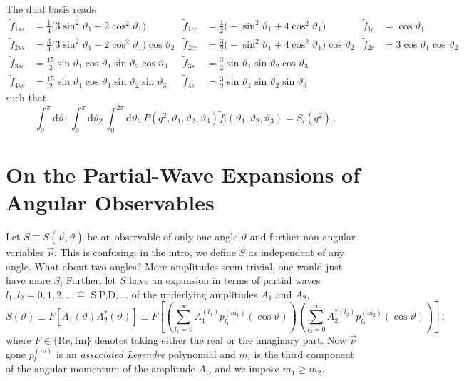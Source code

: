\documentclass[aps,prd,reprint,nofootinbib,preprintnumbers]{revtex4}
\newcommand{\dual}[1]{\tilde{#1}}
\newcommand{\nuvec}{\vec{\nu}}
\newcommand{\rmdx}[1]{\mbox{d} #1 \,} %
\renewcommand{\theta}{\vartheta}
\newcommand{\fred}[1]{{\color{brown!85!black}#1}}
\begin{document}
The dual basis reads
\begin{equation}
    \begin{aligned}
        \dual f_{1ss} & = \frac{1}{4}\big(3 \sin^2\theta_1 - 2 \cos^2\theta_1\big) &
        \dual f_{1cc} & = \frac{1}{2}\big(- \sin^2\theta_1 + 4 \cos^2\theta_1\big) &
        \dual f_{1c}  & = \cos\theta_1\\
        \dual f_{2ss} & = \frac{3}{4}\big(3 \sin^2\theta_1 - 2 \cos^2\theta_1\big) \cos\theta_2 &
        \dual f_{2cc} & = \frac{3}{2}\big(- \sin^2\theta_1 + 4 \cos^2\theta_1\big) \cos\theta_2 &
        \dual f_{2c}  & = 3 \cos\theta_1   \cos\theta_2 \\
        \dual f_{3sc} & = \frac{15}{2}\sin\theta_1 \cos\theta_1 \sin\theta_2 \cos\theta_3 &
        \dual f_{3s}  & = \frac{3}{2} \sin\theta_1              \sin\theta_2 \cos\theta_3 \\
        \dual f_{4sc} & = \frac{15}{2}\sin\theta_1 \cos\theta_1 \sin\theta_2 \sin\theta_3 &
        \dual f_{4s}  & = \frac{3}{2} \sin\theta_1              \sin\theta_2 \sin\theta_3
    \end{aligned}
\end{equation}
such that
\begin{equation}
    \int_0^\pi \rmdx{\theta_1} \int_0^\pi \rmdx{\theta_2} \int_0^{2\pi} \rmdx{\theta_3} P(q^2, \theta_1, \theta_2, \theta_3) \dual{f}_i(\theta_1, \theta_2, \theta_3) = S_i(q^2)\,.
\end{equation}


\section{On the Partial-Wave Expansions of Angular Observables}
\label{app:partial-waves}

Let $S \equiv S(\vec{\nu},\theta)$ be an observable of only one angle $\theta$ and further non-angular variables $\vec{\nu}$. \fred{This is confusing: in the intro, we define $S$ as independent of any angle.} \fred{What about two angles? More amplitudes seem trivial, one would just have more $S_i$} Further, let
$S$ have an expansion in terms of partial waves $l_1, l_2 = 0,1,2,\dots \hat{=}$ S,P,D$,\dots$ of the underlying amplitudes $A_1$ and $A_2$,
\begin{equation}
    \label{eq:def-partial-wave-observable}
    S(\theta) \equiv F\left[A_1(\theta) A_2^*(\theta)\right] \equiv F\left[\left(\sum_{l_1=0}^\infty A_1^{(l_1)} p_{l_1}^{(m_1)}(\cos\theta)\right) \left(\sum_{l_2=0}^\infty A_2^{*(l_2)} p_{l_2}^{(m_2)}(\cos\theta)\right)\right]\,,
\end{equation}
where $F \in \{\text{Re},\text{Im}\}$ denotes taking either the real
or the imaginary part. \fred{Now $\nuvec$ gone}
$p_{l}^{(m)}$ is an \emph{associated Legendre} polynomial and $m_i$ is the third component of the angular momentum of the amplitude $A_i$, and we impose $m_1 \geq m_2$.\\
\end{document}
